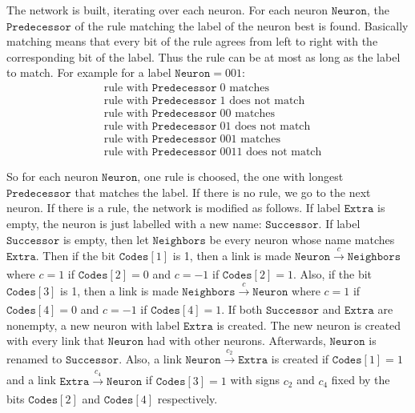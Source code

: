 \documentclass[twocolumn,groupedaddress,floatfix]{article}
\newcommand{\Pred}{\mathtt{Predecessor}}
\newcommand{\Succ}{\mathtt{Successor}}
\newcommand{\Extra}{\mathtt{Extra}}
\newcommand{\Codes}{\mathtt{Codes}}
\begin{document}
The network is built, iterating over each neuron. For each neuron $\mathtt{Neuron}$, the $\Pred$ of the rule matching the label of the neuron best is found.
Basically matching means that every bit of the rule agrees from left to right with the corresponding bit of the label. Thus the rule can be at most as long as the label to match.
For example for a label $\mathtt{Neuron} = 001$:
\begin{align*}
&\textrm{rule with } \Pred \;0 \textrm{ matches} \\
&\textrm{rule with } \Pred \;1 \textrm{ does not match} \\
&\textrm{rule with } \Pred \;00 \textrm{ matches} \\
&\textrm{rule with } \Pred \;01 \textrm{ does not match} \\
&\textrm{rule with } \Pred \;001 \textrm{ matches} \\
&\textrm{rule with } \Pred \;0011 \textrm{ does not match}
\end{align*}

So for each neuron $\mathtt{Neuron}$, one rule is choosed, the one with longest $\Pred$ that matches the label. If there is no rule, we go to the next neuron.
If there is a rule, the network is modified as follows.
If label $\Extra$ is empty, the neuron is just labelled with a new name: $\Succ$. 
If label $\Succ$ is empty, then let $\mathtt{Neighbors}$ be every neuron whose name matches $\Extra$.
Then if the bit $\Codes[1]$ is 1, then a link is made $\mathtt{Neuron} \xrightarrow[]{c} \mathtt{Neighbors}$ where $c = 1$ if $\Codes[2] = 0$ and $c = -1$ if $\Codes[2] = 1$.
Also, if the bit $\Codes[3]$ is 1, then a link is made $\mathtt{Neighbors} \xrightarrow[]{c} \mathtt{Neuron}$ where $c = 1$ if $\Codes[4] = 0$ and $c = -1$ if $\Codes[4] = 1$.
If both $\Succ$ and $\Extra$ are nonempty, a new neuron with label $\Extra$ is created. The new neuron is created with every link that $\mathtt{Neuron}$ had with other neurons. Afterwards, $\mathtt{Neuron}$ is renamed to $\Succ$.
Also, a link $\mathtt{Neuron} \xrightarrow[]{c_2} \mathtt{Extra}$ is created if $\Codes[1] = 1$ and a link $\mathtt{Extra} \xrightarrow[]{c_4} \mathtt{Neuron}$ if $\Codes[3] = 1$ with signs $c_2$ and $c_4$ fixed by the bits  $\Codes[2]$ and  $\Codes[4]$ respectively.
\end{document}
